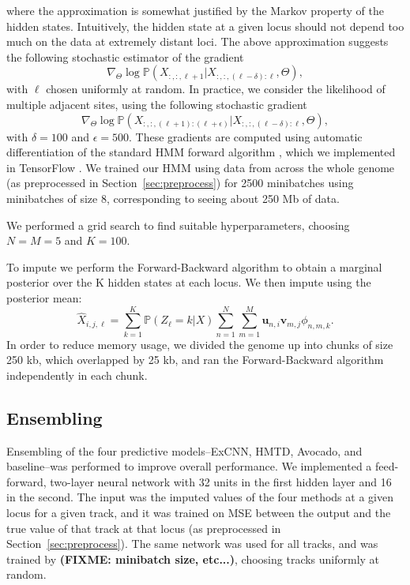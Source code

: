 \documentclass[11pt]{article}
\def\fixme#1{\textbf{(FIXME: #1)}}
\begin{document}
where the approximation is somewhat justified by the Markov property of the hidden states. Intuitively, the hidden state at a given locus should not depend too much on the data at extremely distant loci. The above approximation suggests the following stochastic estimator of the gradient
\[
\nabla_\Theta \log\mathbb{P}(X_{:, :, \ell+1} | X_{:, :, (\ell-\delta):\ell}, \Theta),
\]
with $\ell$ chosen uniformly at random. In practice, we consider the likelihood of multiple adjacent sites, using the following stochastic gradient
\[
\nabla_\Theta \log\mathbb{P}(X_{:, :,(\ell+1):(\ell + \epsilon)} | X_{:, :, (\ell-\delta):\ell}, \Theta),
\]
with $\delta=100$ and $\epsilon=500$. These gradients are computed using automatic differentiation of the standard HMM forward algorithm \cite{rabiner1986introduction}, which we implemented in TensorFlow \cite{abadi2015tensorflow}. We trained our HMM using data from across the whole genome (as preprocessed in Section~\ref{sec:preprocess}) for 2500 minibatches using minibatches of size 8, corresponding to seeing about 250 Mb of data.

We performed a grid search to find suitable hyperparameters, choosing $N=M=5$ and $K=100$.

To impute we perform the Forward-Backward algorithm \cite{rabiner1986introduction} to obtain a marginal posterior over the K hidden states at each locus. We then impute using the posterior mean:
\[
\hat{X}_{i,j,\ell} = \sum_{k=1}^K \mathbb{P}(Z_\ell = k | X)\sum_{n=1}^N\sum_{m=1}^M \mathbf{u}_{n,i}\mathbf{v}_{m,j} \phi_{n,m,k}.
\]
In order to reduce memory usage, we divided the genome up into chunks of size 250 kb, which overlapped by 25 kb, and ran the Forward-Backward algorithm independently in each chunk.


\subsection{Ensembling}
Ensembling of the four predictive models--ExCNN, HMTD, Avocado, and baseline--was performed to improve overall performance. We implemented a feed-forward, two-layer neural network with 32 units in the first hidden layer and 16 in the second. The input was the imputed values of the four methods at a given locus for a given track, and it was trained on MSE between the output and the true value of that track at that locus (as preprocessed in Section~\ref{sec:preprocess}). The same network was used for all tracks, and was trained by \fixme{minibatch size, etc...}, choosing tracks uniformly at random.
\end{document}

